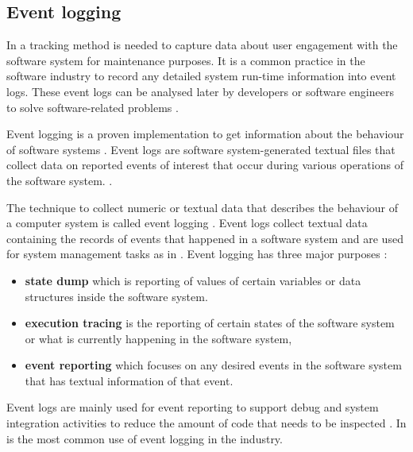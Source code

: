 \subsection{Event logging}\label{sec:ch1_eventLogging}
In  a tracking method is needed to capture data about user engagement with the software system for maintenance purposes. It is a common practice in the software industry to record any detailed system run-time information into event logs. These event logs can be analysed later by developers or software engineers to solve software-related problems \cite{Zhu2019}. \par Event logging is a proven implementation to get information about the behaviour of software systems \cite{Baccanico2014}. Event logs are software system-generated textual files that collect data on reported events of interest that occur during various operations of the software system. \cite{Cinque2013, Baccanico2014}.\par The technique to collect numeric or textual data that describes the behaviour of a computer system is called event logging \cite{Pecchia2015, Baccanico2014}. Event logs collect textual data containing the records of events that happened in a software system and are used for system management tasks as in  \cite{Rong2018a, Rong2018, Baccanico2014}. Event logging has three major purposes \cite{Pecchia2015, Baccanico2014}:

\begin{itemize}
	\item \textbf{state dump} which is reporting of values of certain variables or data structures inside the software system.
	\item \textbf{execution tracing} is the reporting of certain states of the software system or what is currently happening in the software system,
	\item \textbf{event reporting} which focuses on any desired events in the software system that has textual information of that event.
\end{itemize}

Event logs are mainly used for event reporting to support debug and system integration activities to reduce the amount of code that needs to be inspected \cite{Baccanico2014}. In  is the most common use of event logging in the industry.

